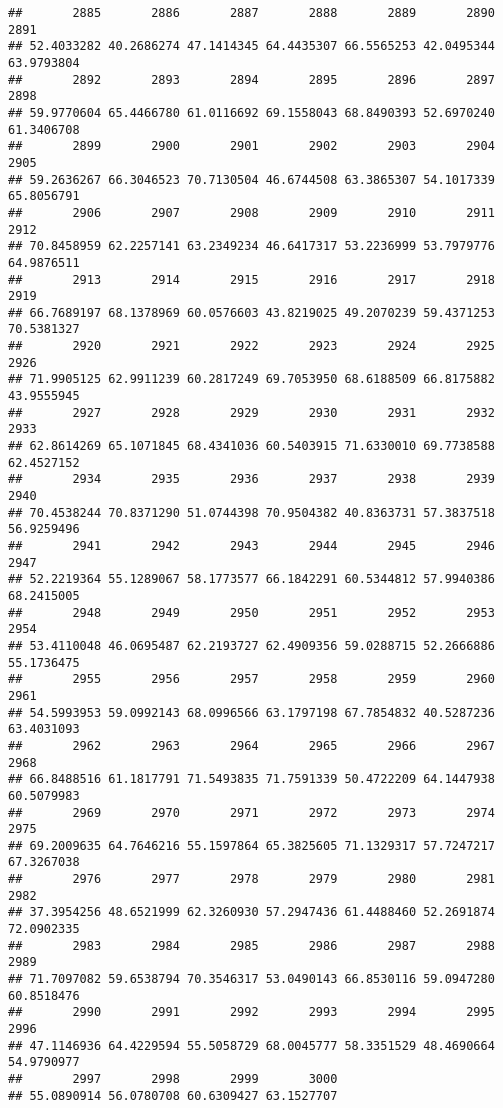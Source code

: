 \documentclass[
]{article}
\begin{document}
\begin{verbatim}
##       2885       2886       2887       2888       2889       2890       2891 
## 52.4033282 40.2686274 47.1414345 64.4435307 66.5565253 42.0495344 63.9793804 
##       2892       2893       2894       2895       2896       2897       2898 
## 59.9770604 65.4466780 61.0116692 69.1558043 68.8490393 52.6970240 61.3406708 
##       2899       2900       2901       2902       2903       2904       2905 
## 59.2636267 66.3046523 70.7130504 46.6744508 63.3865307 54.1017339 65.8056791 
##       2906       2907       2908       2909       2910       2911       2912 
## 70.8458959 62.2257141 63.2349234 46.6417317 53.2236999 53.7979776 64.9876511 
##       2913       2914       2915       2916       2917       2918       2919 
## 66.7689197 68.1378969 60.0576603 43.8219025 49.2070239 59.4371253 70.5381327 
##       2920       2921       2922       2923       2924       2925       2926 
## 71.9905125 62.9911239 60.2817249 69.7053950 68.6188509 66.8175882 43.9555945 
##       2927       2928       2929       2930       2931       2932       2933 
## 62.8614269 65.1071845 68.4341036 60.5403915 71.6330010 69.7738588 62.4527152 
##       2934       2935       2936       2937       2938       2939       2940 
## 70.4538244 70.8371290 51.0744398 70.9504382 40.8363731 57.3837518 56.9259496 
##       2941       2942       2943       2944       2945       2946       2947 
## 52.2219364 55.1289067 58.1773577 66.1842291 60.5344812 57.9940386 68.2415005 
##       2948       2949       2950       2951       2952       2953       2954 
## 53.4110048 46.0695487 62.2193727 62.4909356 59.0288715 52.2666886 55.1736475 
##       2955       2956       2957       2958       2959       2960       2961 
## 54.5993953 59.0992143 68.0996566 63.1797198 67.7854832 40.5287236 63.4031093 
##       2962       2963       2964       2965       2966       2967       2968 
## 66.8488516 61.1817791 71.5493835 71.7591339 50.4722209 64.1447938 60.5079983 
##       2969       2970       2971       2972       2973       2974       2975 
## 69.2009635 64.7646216 55.1597864 65.3825605 71.1329317 57.7247217 67.3267038 
##       2976       2977       2978       2979       2980       2981       2982 
## 37.3954256 48.6521999 62.3260930 57.2947436 61.4488460 52.2691874 72.0902335 
##       2983       2984       2985       2986       2987       2988       2989 
## 71.7097082 59.6538794 70.3546317 53.0490143 66.8530116 59.0947280 60.8518476 
##       2990       2991       2992       2993       2994       2995       2996 
## 47.1146936 64.4229594 55.5058729 68.0045777 58.3351529 48.4690664 54.9790977 
##       2997       2998       2999       3000 
## 55.0890914 56.0780708 60.6309427 63.1527707
\end{verbatim}
\end{document}
